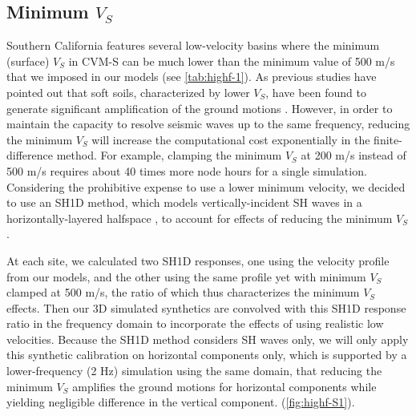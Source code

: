 \subsection{Minimum \textbf{$V_S$}}
Southern California features several low-velocity basins where the minimum (surface) $V_S$ in CVM-S can be much lower than the minimum value of 500 m/s that we imposed in our models (see \cref{tab:highf-1}). As previous studies have pointed out that soft soils, characterized by lower $V_S$, have been found to generate significant amplification of the ground motions . However, in order to maintain the capacity to resolve seismic waves up to the same frequency, reducing the minimum $V_S$ will increase the computational cost exponentially in the finite-difference method. For example, clamping the minimum $V_S$ at 200 m/s instead of 500 m/s requires about 40 times more node hours for a single simulation. Considering the prohibitive expense to use a lower minimum velocity, we decided to use an SH1D method, which models vertically-incident SH waves in a horizontally-layered halfspace , to account for effects of reducing the minimum $V_S$.

At each site, we calculated two SH1D responses, one using the velocity profile from our models, and the other using the same profile yet with minimum $V_S$ clamped at 500 m/s, the ratio of which thus characterizes the minimum $V_S$ effects. Then our 3D simulated synthetics are convolved with this SH1D response ratio in the frequency domain to incorporate the effects of using realistic low velocities. Because the SH1D method considers SH waves only, we will only apply this synthetic calibration on horizontal components only, which is supported by a lower-frequency (2 Hz) simulation using the same domain, that reducing the minimum $V_S$ amplifies the ground motions for horizontal components while yielding negligible difference in the vertical component. (\cref{fig:highf-S1}).

